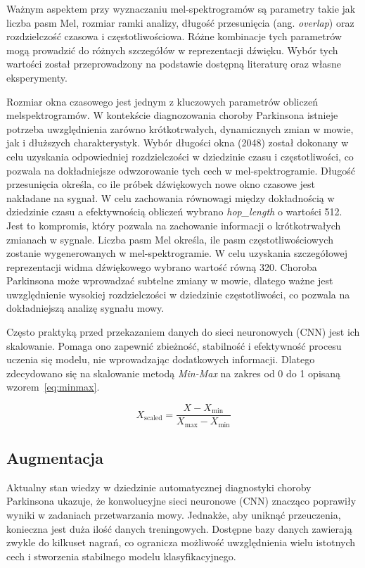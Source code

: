 Ważnym aspektem przy wyznaczaniu mel-spektrogramów są parametry takie jak liczba pasm Mel, rozmiar ramki analizy, długość przesunięcia (ang. \emph{overlap}) oraz rozdzielczość czasowa i częstotliwościowa.
Różne kombinacje tych parametrów mogą prowadzić do różnych szczegółów w reprezentacji dźwięku.
Wybór tych wartości został przeprowadzony na podstawie dostępną literaturę oraz własne eksperymenty.

Rozmiar okna czasowego jest jednym z kluczowych parametrów obliczeń melspektrogramów.
W kontekście diagnozowania choroby Parkinsona istnieje potrzeba uwzględnienia zarówno krótkotrwałych, dynamicznych zmian w mowie, jak i dłuższych charakterystyk.
Wybór długości okna (2048) został dokonany w celu uzyskania odpowiedniej rozdzielczości w dziedzinie czasu i częstotliwości, co pozwala na dokładniejsze odwzorowanie tych cech w mel-spektrogramie.
Długość przesunięcia określa, co ile próbek dźwiękowych nowe okno czasowe jest nakładane na sygnał.
W celu zachowania równowagi między dokładnością w dziedzinie czasu a efektywnością obliczeń wybrano \emph{hop\_length} o wartości 512.
Jest to kompromis, który pozwala na zachowanie informacji o krótkotrwałych zmianach w sygnale.
Liczba pasm Mel określa, ile pasm częstotliwościowych zostanie wygenerowanych w mel-spektrogramie.
W celu uzyskania szczegółowej reprezentacji widma dźwiękowego wybrano wartość równą 320.
Choroba Parkinsona może wprowadzać subtelne zmiany w mowie, dlatego ważne jest uwzględnienie wysokiej rozdzielczości w dziedzinie częstotliwości, co pozwala na dokładniejszą analizę sygnału mowy.


Często praktyką przed przekazaniem danych do sieci neuronowych (CNN) jest ich skalowanie.
Pomaga ono zapewnić zbieżność, stabilność i efektywność procesu uczenia się modelu, nie wprowadzając dodatkowych informacji.
Dlatego zdecydowano się na skalowanie metodą \emph{Min-Max}  na zakres od 0 do 1 opisaną wzorem~\eqref{eq:minmax}.

\begin{equation}
	\label{eq:minmax}
	X_{\text{scaled}} = \frac{X - X_{\min}}{X_{\max} - X_{\min}}
\end{equation}

\subsection{Augmentacja}
\label{subsec:augmentacja}

Aktualny stan wiedzy w dziedzinie automatycznej diagnostyki choroby Parkinsona ukazuje, że konwolucyjne sieci neuronowe (CNN) znacząco poprawiły wyniki w zadaniach przetwarzania mowy.
Jednakże, aby uniknąć przeuczenia, konieczna jest duża ilość danych treningowych.
Dostępne bazy danych zawierają zwykle do kilkuset nagrań, co ogranicza możliwość uwzględnienia wielu istotnych cech i stworzenia stabilnego modelu klasyfikacyjnego.

